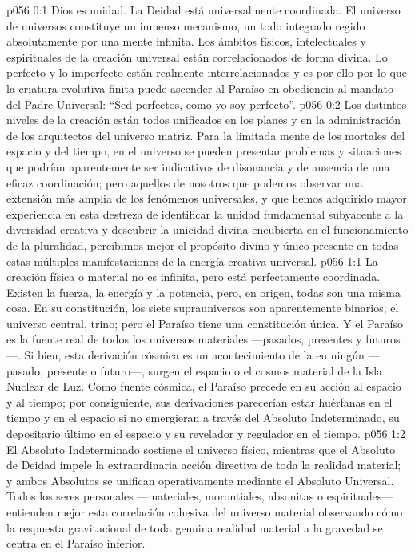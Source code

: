 \author{Mensajero poderoso y Maquiventa Melquisedec}
\vs p056 0:1 Dios es unidad. La Deidad está universalmente coordinada. El universo de universos constituye un inmenso mecanismo, un todo integrado regido absolutamente por una mente infinita. Los ámbitos físicos, intelectuales y espirituales de la creación universal están correlacionados de forma divina. Lo perfecto y lo imperfecto están realmente interrelacionados y es por ello por lo que la criatura evolutiva finita puede ascender al Paraíso en obediencia al mandato del Padre Universal: “Sed perfectos, como yo soy perfecto”.
\vs p056 0:2 Los distintos niveles de la creación están todos unificados en los planes y en la administración de los arquitectos del universo matriz. Para la limitada mente de los mortales del espacio y del tiempo, en el universo se pueden presentar problemas y situaciones que podrían aparentemente ser indicativos de disonancia y de ausencia de una eficaz coordinación; pero aquellos de nosotros que podemos observar una extensión más amplia de los fenómenos universales, y que hemos adquirido mayor experiencia en esta destreza de identificar la unidad fundamental subyacente a la diversidad creativa y descubrir la unicidad divina encubierta en el funcionamiento de la pluralidad, percibimos mejor el propósito divino y único presente en todas estas múltiples manifestaciones de la energía creativa universal.
\vs p056 1:1 La creación física o material no es infinita, pero está perfectamente coordinada. Existen la fuerza, la energía y la potencia, pero, en origen, todas son una misma cosa. En su constitución, los siete suprauniversos son aparentemente binarios; el universo central, trino; pero el Paraíso tiene una constitución única. Y el Paraíso es la fuente real de todos los universos materiales ---pasados, presentes y futuros---. Si bien, esta derivación cósmica es un acontecimiento de la  en ningún  ---pasado, presente o futuro---, surgen el espacio o el cosmos material de la Isla Nuclear de Luz. Como fuente cósmica, el Paraíso precede en su acción al espacio y al tiempo; por consiguiente, sus derivaciones parecerían estar huérfanas en el tiempo y en el espacio si no emergieran a través del Absoluto Indeterminado, su depositario último en el espacio y su revelador y regulador en el tiempo.
\vs p056 1:2 \pc El Absoluto Indeterminado sostiene el universo físico, mientras que el Absoluto de Deidad impele la extraordinaria acción directiva de toda la realidad material; y ambos Absolutos se unifican operativamente mediante el Absoluto Universal. Todos los seres personales ---materiales, morontiales, absonitas o espirituales--- entienden mejor esta correlación cohesiva del universo material observando cómo la respuesta gravitacional de toda genuina realidad material a la gravedad se centra en el Paraíso inferior.
